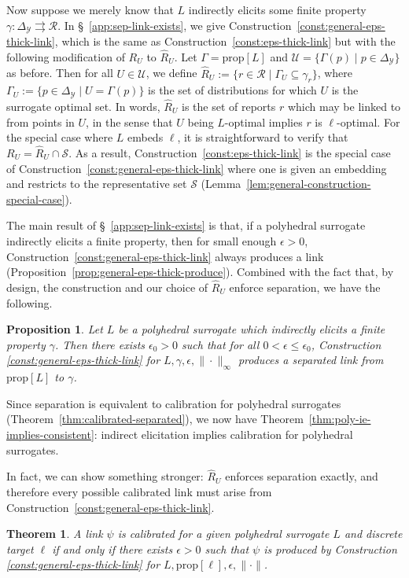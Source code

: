 \documentclass[11pt]{article}
\newcommand{\prop}[1]{\mathrm{prop}[#1]}
\newcommand{\simplex}{\Delta_\Y}
\newcommand{\R}{\mathcal{R}}
\newcommand{\Sc}{\mathcal{S}}
\newcommand{\U}{\mathcal{U}}
\newcommand{\Y}{\mathcal{Y}}
\newcommand{\toto}{\rightrightarrows}
\newtheorem{theorem}{Theorem}
\newtheorem{proposition}{Proposition}
\begin{document}
Now suppose we merely know that $L$ indirectly elicits some finite property $\gamma:\simplex\toto\R$.
In \S~\ref{app:sep-link-exists}, we give Construction~\ref{const:general-eps-thick-link}, which is the same as Construction~\ref{const:eps-thick-link} but with the following modification of $R_U$ to $\hat R_U$.
Let $\Gamma = \prop L$ and $\U = \{\Gamma(p) \mid p \in \simplex\}$ as before.
Then for all $U\in\U$, we define $\hat R_U := \{r\in\R \mid \Gamma_U \subseteq \gamma_r\}$, where $\Gamma_U := \{p\in\simplex \mid U = \Gamma(p)\}$ is the set of distributions for which $U$ is the surrogate optimal set.
In words, $\hat R_U$ is the set of reports $r$ which may be linked to from points in $U$, in the sense that $U$ being $L$-optimal implies $r$ is $\ell$-optimal.
For the special case where $L$ embeds $\ell$, it is straightforward to verify that $R_U = \hat R_U \cap \Sc$.
As a result, Construction~\ref{const:eps-thick-link} is the special case of Construction~\ref{const:general-eps-thick-link} where one is given an embedding and restricts to the representative set $\Sc$ (Lemma~\ref{lem:general-construction-special-case}).

The main result of \S~\ref{app:sep-link-exists} is that, if a polyhedral surrogate indirectly elicits a finite property, then for small enough $\epsilon>0$, Construction~\ref{const:general-eps-thick-link} always produces a link (Proposition~\ref{prop:general-eps-thick-produce}).
Combined with the fact that, by design, the construction and our choice of $\hat R_U$ enforce separation, we have the following.
\begin{proposition}\label{prop:general-eps-thick-separated}
  Let $L$ be a polyhedral surrogate which indirectly elicits a finite property $\gamma$.
  Then there exists $\epsilon_0>0$ such that for all $0 < \epsilon \leq \epsilon_0$, Construction \ref{const:general-eps-thick-link} for $L,\gamma,\epsilon,\|\cdot\|_{\infty}$ produces a separated link from $\prop{L}$ to $\gamma$.
\end{proposition}
\noindent
Since separation is equivalent to calibration for polyhedral surrogates (Theorem~\ref{thm:calibrated-separated}), we now have Theorem~\ref{thm:poly-ie-implies-consistent}: indirect elicitation implies calibration for polyhedral surrogates.


In fact, we can show something stronger: $\hat R_U$ enforces separation exactly, and therefore every possible calibrated link must arise from Construction~\ref{const:general-eps-thick-link}.

\begin{theorem}\label{thm:link-char}
  A link $\psi$ is calibrated for a given polyhedral surrogate $L$ and discrete target $\ell$ if and only if there exists $\epsilon>0$ such that $\psi$ is produced by Construction \ref{const:general-eps-thick-link} for $L,\prop\ell,\epsilon,\|\cdot\|$.
\end{theorem}
\end{document}
